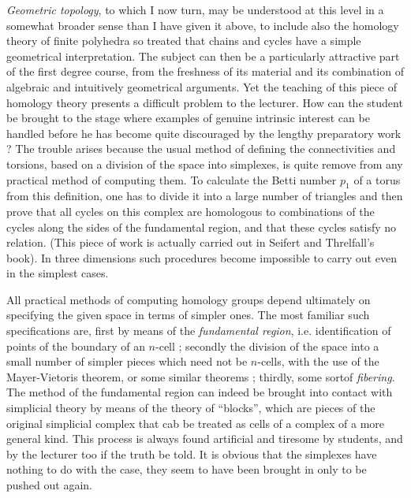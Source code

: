 \textit{Geometric topology}, to which I now turn, may be understood at
this level in a somewhat broader sense than I have given it above, to
include also the homology theory of finite polyhedra so treated that
chains and cycles have a simple geometrical interpretation. The
subject can then be a particularly attractive part of the first degree
course, from the freshness of its material and its combination of
algebraic and intuitively geometrical arguments. Yet the teaching of
this piece of homology theory presents a difficult problem to the
lecturer. How can the student be brought to the stage where examples
of genuine intrinsic interest can be handled before he has become
quite discouraged by the lengthy preparatory work ? The trouble arises
because the usual method of defining the connectivities and torsions,
based on a division of the space into simplexes, is quite remove from
any practical method of computing them. To calculate the Betti number
$p_1$ of a torus from this definition, one has to divide it into a
large number of triangles and then prove that all cycles on this
complex are homologous to combinations of the cycles along the sides
of the fundamental region, and that these cycles satisfy no
relation. (This piece of work is actually carried out in Seifert and
Threlfall's book). In three dimensions such procedures become
impossible to carry out even in the simplest cases.

All practical methods of computing homology groups depend ultimately
on specifying the given space in terms of simpler ones. The most
familiar such specifications are, first by means of the
\textit{fundamental region}, i.e. identification of points of the
boundary of an $n$-cell ; secondly the division of the space into a
small number of simpler pieces which need not be $n$-cells, with the
use of the Mayer-Vietoris theorem, or some similar theorems ;
thirdly, some sort\pageoriginale of \textit{fibering}. The method of
the fundamental region can indeed be brought into contact with
simplicial theory by means of the theory of ``blocks'', which are
pieces of the original simplicial complex that cab be treated as cells
of a complex of a more general kind. This process is always found
artificial and tiresome by students, and by the lecturer too if the
truth be told. It is obvious that the simplexes have nothing to do
with the case, they seem to have been brought in only to be pushed out again.

